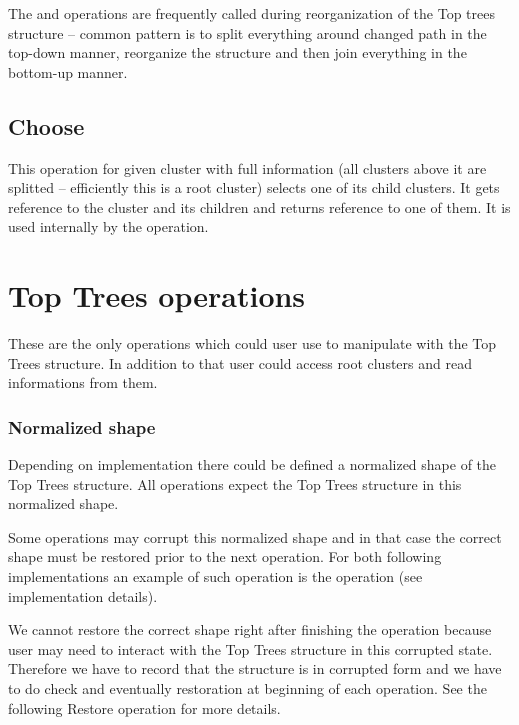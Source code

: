 The \Join{} and \Split{} operations are frequently called during reorganization of the
Top trees structure -- common pattern is to split everything around changed path
in the top-down manner, reorganize the structure and then join everything in the
bottom-up manner.

\subsection{\sc Choose}

This operation for given cluster with full information (all clusters above it
are splitted -- efficiently this is a root cluster) selects one of its child
clusters. It gets reference to the cluster and its children and returns
reference to one of them. It is used internally by the \Search{} operation.



\section{Top Trees operations}

These are the only operations which could user use to manipulate with the Top
Trees structure. In addition to that user could access root clusters and read
informations from them.

\subsubsection{Normalized shape}

Depending on implementation there could be defined a normalized shape of the
Top Trees structure. All operations expect the Top Trees structure in this
normalized shape.

Some operations may corrupt this normalized shape and in that case the correct
shape must be restored prior to the next operation. For both following
implementations an example of such operation is the \Expose{} operation (see
implementation details).

We cannot restore the correct shape right after finishing the operation because
user may need to interact with the Top Trees structure in this corrupted state.
Therefore we have to record that the structure is in corrupted form and we have
to do check and eventually restoration at beginning of each operation. See the
following {\I Restore} operation for more details.

